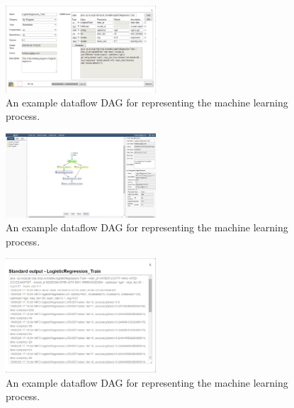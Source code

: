 \documentclass{sig-alternate-05-2015}
\begin{document}
\begin{figure}[!htb]
\centering
\includegraphics[width = 0.5\textwidth]{Upload_Program.eps}
\caption{An example dataflow DAG for representing the machine learning process.}
\label{fig:dag}
\end{figure}


\begin{figure}[!htb]
\centering
\includegraphics[width = 0.5\textwidth]{LR_Task_example.eps}
\caption{An example dataflow DAG for representing the machine learning process.}
\label{fig:dag}
\end{figure}

\begin{figure}[!htb]
\centering
\includegraphics[width = 0.5\textwidth]{LR_Task_stdout.eps}
\caption{An example dataflow DAG for representing the machine learning process.}
\label{fig:dag}
\end{figure}
\end{document}
